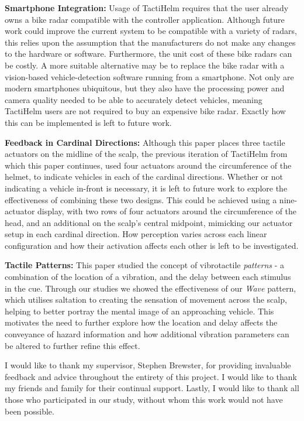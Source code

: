 \documentclass{mpaper}
\begin{document}
\textbf{Smartphone Integration:} Usage of TactiHelm requires that the user already owns a bike radar compatible with the controller application. Although future work could improve the current system to be compatible with a variety of radars, this relies upon the assumption that the manufacturers do not make any changes to the hardware or software. Furthermore, the unit cost of these bike radars can be costly. A more suitable alternative may be to replace the bike radar with a vision-based vehicle-detection software running from a smartphone. Not only are modern smartphones ubiquitous, but they also have the processing power and camera quality needed to be able to accurately detect vehicles, meaning TactiHelm users are not required to buy an expensive bike radar. Exactly how this can be implemented is left to future work.

\textbf{Feedback in Cardinal Directions:} Although this paper places three tactile actuators on the midline of the scalp, the previous iteration of TactiHelm from which this paper continues, used four actuators around the circumference of the helmet, to indicate vehicles in each of the cardinal directions. Whether or not indicating a vehicle in-front is necessary, it is left to future work to explore the effectiveness of combining these two designs. This could be achieved using a nine-actuator display, with two rows of four actuators around the circumference of the head, and an additional on the scalp's central midpoint, mimicking our actuator setup in each cardinal direction. How perception varies across each linear configuration and how their activation affects each other is left to be investigated.

\textbf{Tactile Patterns:} This paper studied the concept of vibrotactile \textit{patterns} - a combination of the location of a vibration, and the delay between each stimulus in the cue. Through our studies we showed the effectiveness of our \textit{Wave} pattern, which utilises saltation to creating the sensation of movement across the scalp, helping to better portray the mental image of an approaching vehicle. This motivates the need to further explore how the location and delay affects the conveyance of hazard information and how additional vibration parameters can be altered to further refine this effect.


\vspace{.4cm}{\bf Acknowledgments.}
I would like to thank my supervisor, Stephen Brewster, for providing invaluable feedback and advice throughout the entirety of this project. I would like to thank my friends and family for their continual support. Lastly, I would like to thank all those who participated in our study, without whom this work would not have been possible.




\end{document}
